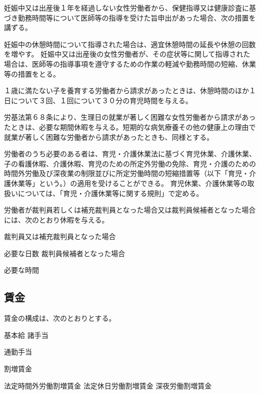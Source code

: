 \documentclass[10pt,a4paper,uplatex]{jsarticle}
\begin{document}
\term
妊娠中又は出産後１年を経過しない女性労働者から、保健指導又は健康診査に基づき勤務時間等について医師等の指導を受けた旨申出があった場合、次の措置を講ずる。
\begin{enumerate}
    \itm 妊娠中の休憩時間について指導された場合は、適宜休憩時間の延長や休憩の回数を増やす。
    \itm 妊娠中又は出産後の女性労働者が、その症状等に関して指導された場合は、医師等の指導事項を遵守するための作業の軽減や勤務時間の短縮、休業等の措置をとる。
\end{enumerate}

１歳に満たない子を養育する労働者から請求があったときは、休憩時間のほか１日について３回、１回について３０分の育児時間を与える。

労基法第６８条により、生理日の就業が著しく困難な女性労働者から請求があったときは、必要な期間休暇を与える。短期的な病気療養その他の健康上の理由で就業が著しく困難な労働者から請求があったときも、同様とする。

労働者のうち必要のある者は、育児・介護休業法に基づく育児休業、介護休業、子の看護休暇、介護休暇、育児のための所定外労働の免除、育児・介護のための時間外労働及び深夜業の制限並びに所定労働時間の短縮措置等（以下「育児・介護休業等」という。）の適用を受けることができる。
\term
育児休業、介護休業等の取扱いについては、「育児・介護休業等に関する規則」で定める。

労働者が裁判員若しくは補充裁判員となった場合又は裁判員候補者となった場合には、次のとおり休暇を与える。
\begin{enumerate}
    \itm 裁判員又は補充裁判員となった場合 \par 必要な日数
    \itm 裁判員候補者となった場合\par 必要な時間
\end{enumerate}


\subsection{賃金}

賃金の構成は、次のとおりとする。
\begin{enumerate}
    \itm 基本給
    \itm 諸手当
    \begin{enumerate}
        \itm 通勤手当
    \end{enumerate}
    \itm 割増賃金
    \begin{enumerate}
        \itm 法定時間外労働割増賃金
        \itm 法定休日労働割増賃金
        \itm 深夜労働割増賃金
    \end{enumerate}
\end{enumerate}
\end{document}
